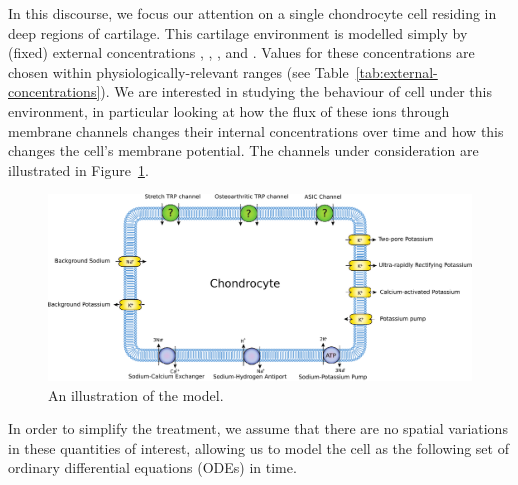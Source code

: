 In this discourse, we focus our attention on a single chondrocyte cell
residing in deep regions of cartilage. This cartilage environment is
modelled simply by (fixed) external concentrations \Nao, \Ko, \Cao,
and \Ho. Values for these concentrations are chosen within
physiologically-relevant ranges (see
Table~\ref{tab:external-concentrations}). We are interested in
studying the behaviour of cell under this environment, in particular
looking at how the flux of these ions through membrane channels
changes their internal concentrations over time and how this changes
the cell's membrane potential. The channels under consideration are
illustrated in Figure~\ref{fig:chondrocyte-model}.

\begin{figure}[ht]
  \centering
  \includegraphics[width=\textwidth]
  {../images/pdf/chondrocyte-model-cellml}
  \caption{An illustration of the model.}
  \label{fig:chondrocyte-model}
\end{figure}

In order to simplify the treatment, we assume that there are no
spatial variations in these quantities of interest, allowing us to
model the cell as the following set of ordinary differential equations
(ODEs) in time.

